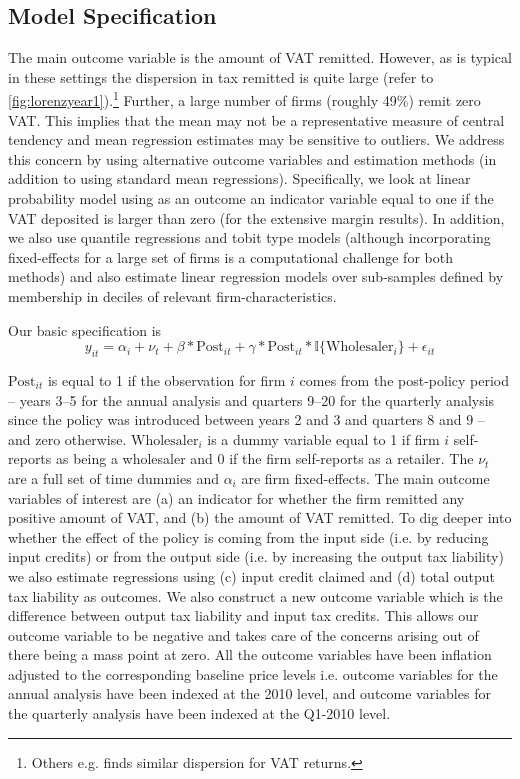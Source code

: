 \subsection{Model Specification}
\label{subsec:identification_model}
The main outcome variable is the amount of VAT remitted. However, as is typical in these settings the dispersion in tax remitted is quite large (refer to \cref{fig:lorenzyear1}).\footnote{Others e.g. \citet{pomeranz2015no} finds similar dispersion for VAT returns.} Further, a large number of firms (roughly 49\%) remit zero VAT. This implies that the mean may not be a representative measure of central tendency and mean regression estimates may be sensitive to outliers. We address this concern by using alternative outcome variables and estimation methods (in addition to using standard mean regressions). Specifically, we look at linear probability model using as an outcome an indicator variable equal to one if the VAT deposited is larger than zero (for the extensive margin results). In addition, we also use quantile regressions and tobit type models (although incorporating fixed-effects for a large set of firms is a computational challenge for both methods) and also estimate linear regression models over sub-samples defined by membership in deciles of relevant firm-characteristics.


Our basic specification is
\begin{equation}\label{eq:basic}
y_{it}=\alpha_i+\nu_t+\beta*\text{Post}_{it}+\gamma*\text{Post}_{it}*\mathbb{I}\{\text{Wholesaler}_{i}\}+\epsilon_{it}
\end{equation}

$\text{Post}_{it}$ is equal to 1 if the observation for firm $i$ comes from the post-policy period -- years 3--5 for the annual analysis and quarters 9--20 for the quarterly analysis since the policy was introduced between years 2 and 3 and quarters 8 and 9 -- and zero otherwise. $\text{Wholesaler}_{i}$ is a dummy variable equal to 1 if firm $i$ self-reports as being a wholesaler and 0 if the firm self-reports as a retailer. The $\nu_{t}$ are a full set of time dummies and $\alpha_{i}$ are firm fixed-effects. The main outcome variables of interest are (a) an indicator for whether the firm remitted any positive amount of VAT, and (b) the amount of VAT remitted. To dig deeper into whether the effect of the policy is coming from the input side (i.e. by reducing input credits) or from the output side (i.e. by increasing the output tax liability) we
also estimate regressions using (c) input credit claimed and (d) total output tax liability as outcomes. We also construct a new outcome variable which is the difference between output tax liability and input tax credits. This allows our outcome variable to be negative and takes care of the concerns arising out of there being a mass point at
zero. All the outcome variables have been inflation adjusted to the corresponding baseline price levels i.e. outcome variables for the annual analysis have been indexed at the 2010 level, and outcome variables for the quarterly analysis have been indexed at the Q1-2010 level. 

